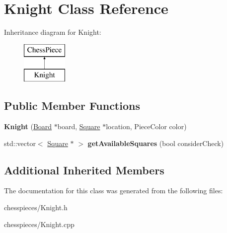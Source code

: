 \hypertarget{class_knight}{}\section{Knight Class Reference}
\label{class_knight}
Inheritance diagram for Knight\+:\begin{figure}[H]
\begin{center}
\leavevmode
\includegraphics[height=2.000000cm]{class_knight}
\end{center}
\end{figure}
\subsection*{Public Member Functions}
\begin{DoxyCompactItemize}
\item 
\mbox{\label{class_knight_a05aa3fb92b9791437b3ab86b8f2865f4}} 
{\bfseries Knight} (\mbox{\hyperlink{class_board}{Board}} $\ast$board, \mbox{\hyperlink{class_square}{Square}} $\ast$location, Piece\+Color color)
\item 
\mbox{\label{class_knight_ae64ee94abb50171423efc7608a2337ca}} 
std\+::vector$<$ \mbox{\hyperlink{class_square}{Square}} $\ast$ $>$ {\bfseries get\+Available\+Squares} (bool consider\+Check)
\end{DoxyCompactItemize}
\subsection*{Additional Inherited Members}


The documentation for this class was generated from the following files\+:\begin{DoxyCompactItemize}
\item 
chesspieces/Knight.\+h\item 
chesspieces/Knight.\+cpp\end{DoxyCompactItemize}
